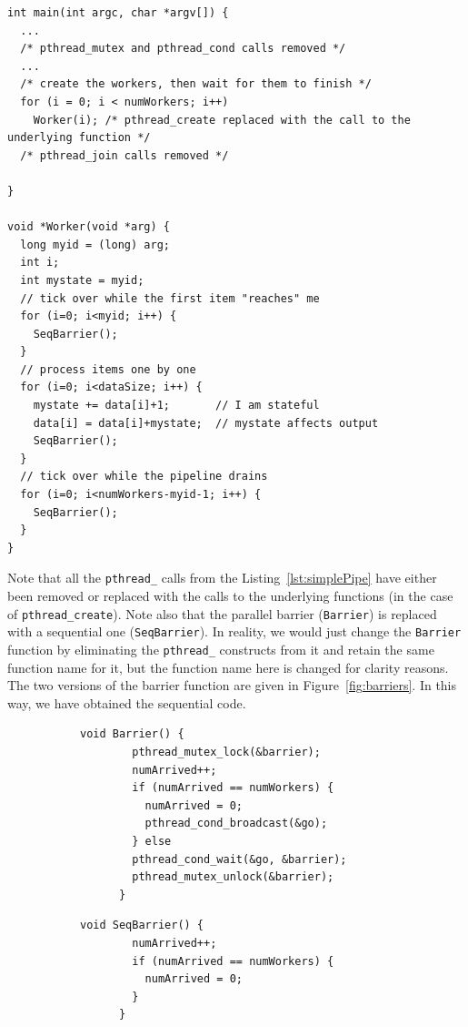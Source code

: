 \begin{lstlisting}[caption=Simple Pipeline Code with Parallelism Removed, frame=single, label=lst:pipeParRem]
int main(int argc, char *argv[]) {
  ...
  /* pthread_mutex and pthread_cond calls removed */
  ...
  /* create the workers, then wait for them to finish */
  for (i = 0; i < numWorkers; i++)
    Worker(i); /* pthread_create replaced with the call to the underlying function */
  /* pthread_join calls removed */
    
}

void *Worker(void *arg) {
  long myid = (long) arg;
  int i;
  int mystate = myid;
  // tick over while the first item "reaches" me
  for (i=0; i<myid; i++) {
    SeqBarrier();
  }
  // process items one by one
  for (i=0; i<dataSize; i++) {
    mystate += data[i]+1;       // I am stateful
    data[i] = data[i]+mystate;  // mystate affects output
    SeqBarrier();
  }
  // tick over while the pipeline drains
  for (i=0; i<numWorkers-myid-1; i++) {
    SeqBarrier();
  }
}
\end{lstlisting}

\noindent
Note that all the \lstinline{pthread_} calls from the Listing~\ref{lst:simplePipe} have either been removed or replaced with the calls to the underlying functions (in the case of \lstinline{pthread_create}). Note also that the parallel barrier (\lstinline{Barrier}) is replaced with a sequential one (\lstinline{SeqBarrier}). In reality, we would just change the \lstinline{Barrier} function by eliminating the \lstinline{pthread_} constructs from it and retain the same function name for it, but the function name here is changed for clarity reasons. The two versions of the barrier function are given in Figure~\ref{fig:barriers}. In this way, we have obtained the sequential code.

\begin{figure}[ht]
  \begin{subfigure}{.45\textwidth}
    \begin{lstlisting}[caption=Parallel Barrier]
      void Barrier() {
        pthread_mutex_lock(&barrier);
        numArrived++;
        if (numArrived == numWorkers) {
          numArrived = 0;
          pthread_cond_broadcast(&go);
        } else
        pthread_cond_wait(&go, &barrier);
        pthread_mutex_unlock(&barrier);
      }
    \end{lstlisting}
  \end{subfigure}

    \begin{subfigure}{.45\textwidth}
    \begin{lstlisting}[caption=Sequential Barrier]
      void SeqBarrier() {
        numArrived++;
        if (numArrived == numWorkers) {
          numArrived = 0;
        } 
      }
    \end{lstlisting}
  \end{subfigure}

\end{figure}


